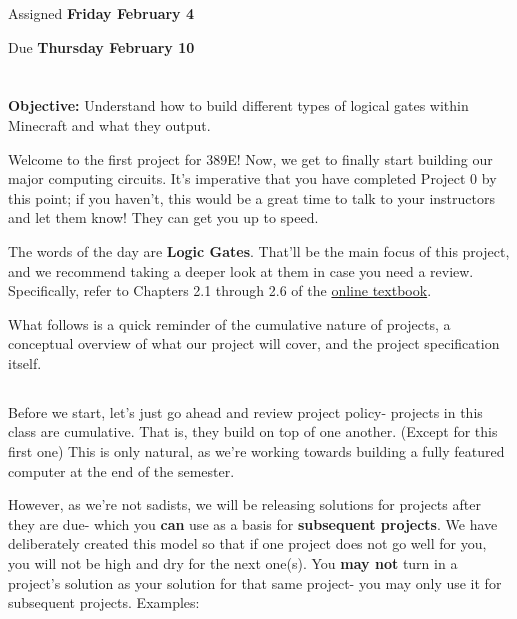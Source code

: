 \documentclass{article}
\begin{document}
\large

{\selectfont{\Huge CMSC389E Project 1: \par Arithmetic Logic Unit- Logic Gates}}

Assigned \textbf{Friday February 4}

Due \textbf{Thursday February 10}

\section{\selectfont{The First (Real) Project}}

\textbf{Objective:} Understand how to build different types of logical gates within Minecraft and what they output.

Welcome to the first project for 389E! Now, we get to finally start building our major computing circuits.
It's imperative that you have completed Project 0 by this point; if you haven't, this would be a great time to talk to your instructors and let them know! 
They can get you up to speed.

The words of the day are \textbf{Logic Gates}. That'll be the main focus of this project, and we recommend taking a deeper look at them in case you need a review. Specifically, refer to Chapters 2.1 through 2.6 of the \href{https://cmsc-389e.github.io/digital-logic-computer-architecture-minecraft/index.html}{online textbook}.

What follows is a quick reminder of the cumulative nature of projects, a conceptual overview of what our project will cover, and the project specification itself.

\subsection{\selectfont{Projects are Cumulative}}

Before we start, let's just go ahead and review project policy- projects in this class are cumulative. That is, they build on top of one another. (Except for this first one) This is only natural, as we're working towards building a fully featured computer at the end of the semester. 

However, as we're not sadists, we will be releasing solutions for projects after they are due- which you \textbf{can} use as a basis for \textbf{subsequent projects}. We have deliberately created this model so that if one project does not go well for you, you will not be high and dry for the next one(s). You \textbf{may not} turn in a project's solution as your solution for that same project- you may only use it for subsequent projects. Examples:
\end{document}
